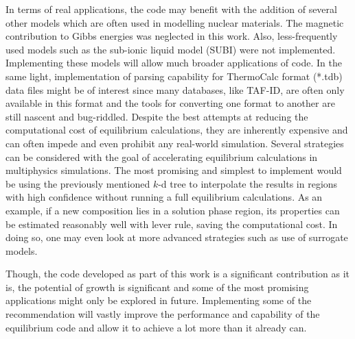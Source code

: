 	In terms of real applications, the code may benefit with the addition of several other models which are often used in modelling nuclear materials. The magnetic contribution to Gibbs energies was neglected in this work. Also, less-frequently used models such as the sub-ionic liquid model (SUBI) were not implemented. Implementing these models will allow much broader applications of code. In the same light, implementation of parsing capability for ThermoCalc format (*.tdb) data files might be of interest since many databases, like TAF-ID, are often only available in this format and the tools for converting one format to another are still nascent and bug-riddled. Despite the best attempts at reducing the computational cost of equilibrium calculations, they are inherently expensive and can often impede and even prohibit any real-world simulation. Several strategies can be considered with the goal of accelerating equilibrium calculations in multiphysics simulations. The most promising and simplest to implement would be using the previously mentioned $k$-d tree to interpolate the results in regions with high confidence without running a full equilibrium calculations. As an example, if a new composition lies in a solution phase region, its properties can be estimated reasonably well with lever rule, saving the computational cost. In doing so, one may even look at more advanced strategies such as use of surrogate models.
 
    Though, the code developed as part of this work is a significant contribution as it is, the potential of growth is significant and some of the most promising applications might only be explored in future. Implementing some of the recommendation will vastly improve the performance and capability of the equilibrium code and allow it to achieve a lot more than it already can.